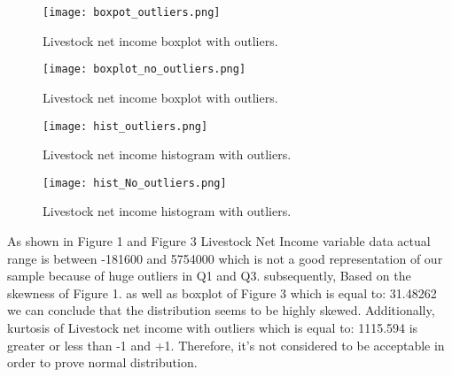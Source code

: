 \documentclass[12pt, a4]{article}
\begin{document}
\newpage
		

\begin{figure}[h]
  \begin{minipage}[t]{0.5\linewidth}
    \centering
    \texttt{[image: boxpot\_outliers.png]}
    \caption{Livestock net income boxplot with outliers.}
    \label{fig:chapter001_dist_001}
  \end{minipage}
  \hspace{0.5cm}
  \begin{minipage}[t]{0.5\linewidth}
    \centering
    \texttt{[image: boxplot\_no\_outliers.png]}
    \caption{Livestock net income boxplot with outliers.}
    \label{fig:chapter001_reward_001}
  \end{minipage}
  \vspace{0.75\baselineskip}
  \end{figure}
\begin{figure}[h]
  \begin{minipage}[b]{0.5\linewidth}
    \centering
    \texttt{[image: hist\_outliers.png]}
    \caption{Livestock net income histogram with outliers.}
    \label{fig:chapter001_dist_001}
  \end{minipage}
  \hspace{0.5cm}
  \begin{minipage}[b]{0.5\linewidth}
    \centering
    \texttt{[image: hist\_No\_outliers.png]}
    \caption{Livestock net income histogram with outliers.}
    \label{fig:chapter001_reward_001}
    \end{minipage}
        
    \end{figure}
\newpage
  
    
  As shown in Figure 1 and Figure 3 Livestock Net Income variable data actual range is
between -181600 and 5754000 which is not a good representation of our
sample because of huge outliers in Q1 and Q3. subsequently, Based on the
skewness of Figure 1. as well as boxplot of Figure 3 which is equal to: 31.48262 we can conclude that the
distribution seems to be highly skewed. Additionally, kurtosis of Livestock net income with outliers
which is equal to: 1115.594 is greater or less than -1 and +1. Therefore,
it's not considered to be acceptable in order to prove normal distribution.
\end{document}
